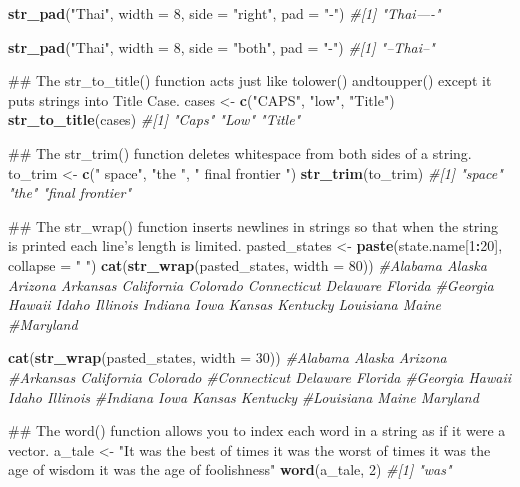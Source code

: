 \documentclass[]{book}
\newenvironment{Shaded}{\begin{snugshade}}{\end{snugshade}}
\newcommand{\KeywordTok}[1]{\textcolor[rgb]{0.13,0.29,0.53}{\textbf{#1}}}
\newcommand{\DataTypeTok}[1]{\textcolor[rgb]{0.13,0.29,0.53}{#1}}
\newcommand{\DecValTok}[1]{\textcolor[rgb]{0.00,0.00,0.81}{#1}}
\newcommand{\StringTok}[1]{\textcolor[rgb]{0.31,0.60,0.02}{#1}}
\newcommand{\CommentTok}[1]{\textcolor[rgb]{0.56,0.35,0.01}{\textit{#1}}}
\newcommand{\OperatorTok}[1]{\textcolor[rgb]{0.81,0.36,0.00}{\textbf{#1}}}
\newcommand{\NormalTok}[1]{#1}
\begin{document}
\begin{Shaded}
\begin{Highlighting}[]
\KeywordTok{str_pad}\NormalTok{(}\StringTok{"Thai"}\NormalTok{, }\DataTypeTok{width =} \DecValTok{8}\NormalTok{, }\DataTypeTok{side =} \StringTok{"right"}\NormalTok{, }\DataTypeTok{pad =} \StringTok{"-"}\NormalTok{)}
\CommentTok{#[1] "Thai----"}

\KeywordTok{str_pad}\NormalTok{(}\StringTok{"Thai"}\NormalTok{, }\DataTypeTok{width =} \DecValTok{8}\NormalTok{, }\DataTypeTok{side =} \StringTok{"both"}\NormalTok{, }\DataTypeTok{pad =} \StringTok{"-"}\NormalTok{)}
\CommentTok{#[1] "--Thai--"}

\NormalTok{## The str_to_title() function acts just like tolower() andtoupper() except it puts strings into Title Case.}
\NormalTok{cases <-}\StringTok{ }\KeywordTok{c}\NormalTok{(}\StringTok{"CAPS"}\NormalTok{, }\StringTok{"low"}\NormalTok{, }\StringTok{"Title"}\NormalTok{)}
\KeywordTok{str_to_title}\NormalTok{(cases)}
\CommentTok{#[1] "Caps"  "Low"   "Title"}

\NormalTok{## The str_trim() function deletes whitespace from both sides of a string.}
\NormalTok{to_trim <-}\StringTok{ }\KeywordTok{c}\NormalTok{(}\StringTok{"   space"}\NormalTok{, }\StringTok{"the    "}\NormalTok{, }\StringTok{"    final frontier  "}\NormalTok{)}
\KeywordTok{str_trim}\NormalTok{(to_trim)}
\CommentTok{#[1] "space"          "the"            "final frontier"}

\NormalTok{## The str_wrap() function inserts newlines in strings so that when the string is printed each line’s length is limited.}
\NormalTok{pasted_states <-}\StringTok{ }\KeywordTok{paste}\NormalTok{(state.name[}\DecValTok{1}\OperatorTok{:}\DecValTok{20}\NormalTok{], }\DataTypeTok{collapse =} \StringTok{" "}\NormalTok{)}
\KeywordTok{cat}\NormalTok{(}\KeywordTok{str_wrap}\NormalTok{(pasted_states, }\DataTypeTok{width =} \DecValTok{80}\NormalTok{))}
\CommentTok{#Alabama Alaska Arizona Arkansas California Colorado Connecticut Delaware Florida}
\CommentTok{#Georgia Hawaii Idaho Illinois Indiana Iowa Kansas Kentucky Louisiana Maine}
\CommentTok{#Maryland}

\KeywordTok{cat}\NormalTok{(}\KeywordTok{str_wrap}\NormalTok{(pasted_states, }\DataTypeTok{width =} \DecValTok{30}\NormalTok{))}
\CommentTok{#Alabama Alaska Arizona}
\CommentTok{#Arkansas California Colorado}
\CommentTok{#Connecticut Delaware Florida}
\CommentTok{#Georgia Hawaii Idaho Illinois}
\CommentTok{#Indiana Iowa Kansas Kentucky}
\CommentTok{#Louisiana Maine Maryland}

\NormalTok{## The word() function allows you to index each word in a string as if it were a vector.}
\NormalTok{a_tale <-}\StringTok{ "It was the best of times it was the worst of times it was the age of wisdom it was the age of foolishness"}
\KeywordTok{word}\NormalTok{(a_tale, }\DecValTok{2}\NormalTok{)}
\CommentTok{#[1] "was"}


\end{Highlighting}
\end{Shaded}
\end{document}
